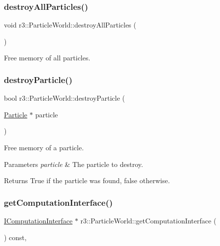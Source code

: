 \subsubsection{\texorpdfstring{destroy\+All\+Particles()}{destroyAllParticles()}}
{\footnotesize\ttfamily void r3\+::\+Particle\+World\+::destroy\+All\+Particles (\begin{DoxyParamCaption}{ }\end{DoxyParamCaption})}



Free memory of all particles. 

\mbox{\label{classr3_1_1_particle_world_a1802231868ed6d99dd677ef71328781a}} 
\subsubsection{\texorpdfstring{destroy\+Particle()}{destroyParticle()}}
{\footnotesize\ttfamily bool r3\+::\+Particle\+World\+::destroy\+Particle (\begin{DoxyParamCaption}\item[{\mbox{\hyperlink{classr3_1_1_particle}{Particle}} $\ast$}]{particle }\end{DoxyParamCaption})}



Free memory of a particle. 


\begin{DoxyParams}{Parameters}
{\em particle} & The particle to destroy. \\
\hline
\end{DoxyParams}
\begin{DoxyReturn}{Returns}
True if the particle was found, false otherwise. 
\end{DoxyReturn}
\mbox{\label{classr3_1_1_particle_world_a1e806bf89ec6445a54b9534f1efc081f}} 
\subsubsection{\texorpdfstring{get\+Computation\+Interface()}{getComputationInterface()}}
{\footnotesize\ttfamily \mbox{\hyperlink{classr3_1_1_i_computation_interface}{I\+Computation\+Interface}} $\ast$ r3\+::\+Particle\+World\+::get\+Computation\+Interface (\begin{DoxyParamCaption}{ }\end{DoxyParamCaption}) const\hspace{0.3cm}{\ttfamily [override]}, {\ttfamily [virtual]}}


